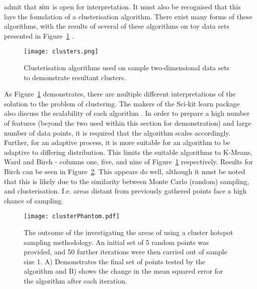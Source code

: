 \textcite{Set08} admit that $\operatorname*{sim}$ is open for interpretation. It must also be recognised that this lays the foundation of a clusterisation algorithm. There exist many forms of these algorithms, with the results of several of these algorithms on toy data sets presented in Figure~\ref{fig:ClusterResults} \cite{SciClus}.

\begin{figure}[h]
  \begin{center}
    \texttt{[image: clusters.png]}
    \caption[]{Clusterisation algorithms used on sample two-dimensional data sets to demonstrate resultant clusters.}
    \label{fig:ClusterResults}
  \end{center}
\end{figure}

As Figure~\ref{fig:ClusterResults} demonstrates, there are multiple different interpretations of the solution to the problem of clustering. The makers of the Sci-kit learn package also discuss the scalability of each algorithm \cite{SciClus}. In order to prepare a high number of features (beyond the two used within this section for demonstration) and large number of data points, it is required that the algorithm scales accordingly. Further, for an adaptive process, it is more suitable for an algorithm to be adaptive to differing distribution. This limits the suitable algorithms to K-Means, Ward and Birch - columns one, five, and nine of Figure~\ref{fig:ClusterResults} respectively. Results for Birch can be seen in Figure~\ref{fig:clusterPhantom}. This appears do well, although it must be noted that this is likely due to the similarity between Monte Carlo (random) sampling, and clusterisation. I.e. areas distant from previously gathered points face a high chance of sampling.

\begin{figure}[h]
  \begin{center}
    \texttt{[image: clusterPhantom.pdf]}
    \caption[Cluster Hotspot Sampling Illustration]{The outcome of the investigating the areas of using a cluster hotspot sampling methodology. An initial set of 5 random points was provided, and 50 further iterations were then carried out of sample size 1. A) Demonstrates the final set of points tested by the algorithm and B) shows the change in the mean squared error for the algorithm after each iteration.}
    \label{fig:clusterPhantom}
  \end{center}
\end{figure}


